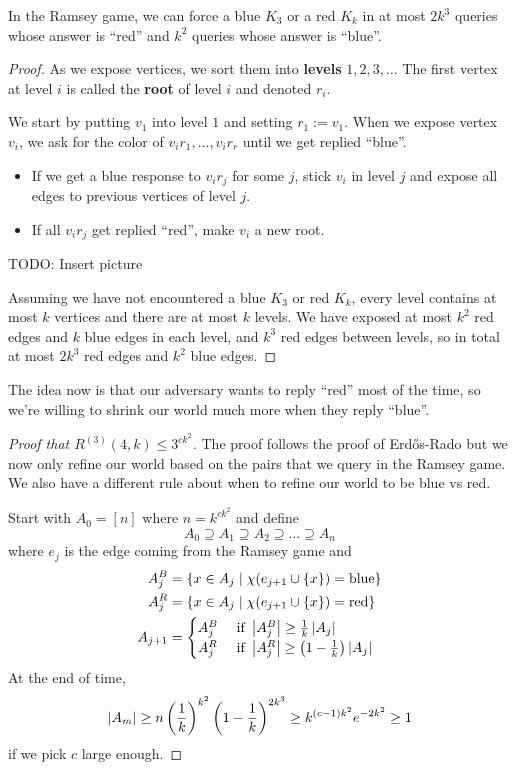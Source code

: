 \documentclass{article}
\begin{document}
\begin{lemma}
  In the Ramsey game, we can force a blue $K_3$ or a red $K_k$ in at most $2k^3$ queries whose answer is ``red'' and $k^2$ queries whose answer is ``blue''.
\end{lemma}
\begin{proof}
  As we expose vertices, we sort them into {\bf levels} $1, 2, 3, \dots$ The first vertex at level $i$ is called the {\bf root} of level $i$ and denoted $r_i$.

  We start by putting $v_1$ into level $1$ and setting $r_1 := v_1$. When we expose vertex $v_i$, we ask for the color of $v_ir_1, \dots, v_ir_r$ until we get replied ``blue''.
  \begin{itemize}
    \item If we get a blue response to $v_ir_j$ for some $j$, stick $v_i$ in level $j$ and expose all edges to previous vertices of level $j$.
    \item If all $v_ir_j$ get replied ``red'', make $v_i$ a new root.
  \end{itemize}
  TODO: Insert picture

  Assuming we have not encountered a blue $K_3$ or red $K_k$, every level contains at most $k$ vertices and there are at most $k$ levels. We have exposed at most $k^2$ red edges and $k$ blue edges in each level, and $k^3$ red edges between levels, so in total at most $2k^3$ red edges and $k^2$ blue edges.
\end{proof}

The idea now is that our adversary wants to reply ``red'' most of the time, so we're willing to shrink our world much more when they reply ``blue''.

\begin{proof}[Proof that $R^{(3)}(4, k) \le 3^{ck^2}$]
  The proof follows the proof of Erd\H os-Rado but we now only refine our world based on the pairs that we query in the Ramsey game. We also have a different rule about when to refine our world to be blue vs red.

  Start with $A_0 = [n]$ where $n = k^{ck^2}$ and define
  $$A_0 \supseteq A_1 \supseteq A_2 \supseteq \dots \supseteq A_n$$
  where $e_j$ is the edge coming from the Ramsey game and
  \begin{align*}
    A_j^B & = \{x \in A_j \mid \chi(e_{j + 1} \cup \{x\}) = \text{blue}\} \\
    A_j^R & = \{x \in A_j \mid \chi(e_{j + 1} \cup \{x\}) = \text{red}\} \\
    A_{j + 1} & =
    \begin{cases}
      A_j^B & \text{ if } \left\lvert A_j^B\right\rvert \ge \frac 1k \left\lvert A_j\right\rvert \\
      A_j^R & \text{ if } \left\lvert A_j^R\right\rvert \ge \left(1 - \frac 1k\right) \left\lvert A_j\right\rvert
    \end{cases}
  \end{align*}
  At the end of time,
  $$\left\lvert A_m\right\rvert \ge n\left(\frac 1k\right)^{k^2}\left(1 - \frac 1k\right)^{2k^3} \ge k^{(c - 1)k^2}e^{-2k^2} \ge 1$$
  if we pick $c$ large enough.
\end{proof}
\end{document}
